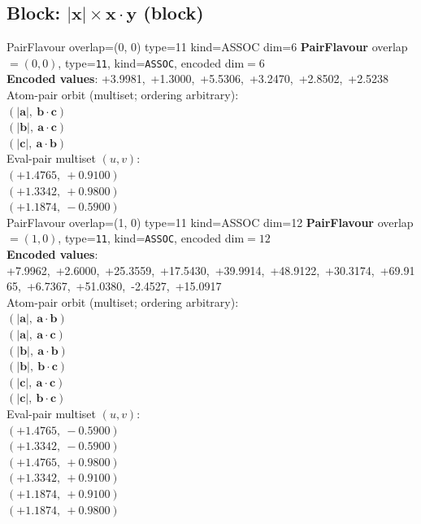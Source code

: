 \documentclass[a4paper,11pt]{article}
\newcommand{\vc}[1]{\ensuremath{\mathbf{#1}}}
\newcommand{\dnfagmiihhiejm}[1]{|\vc{#1}|}
\newcommand{\pdcegfomjfhook}[2]{\mathbf{#1} \cdot \mathbf{#2}}
\begin{document}
\subsection{Block: $\dnfagmiihhiejm{x} \times \pdcegfomjfhook{x}{y}$  (block)}
    PairFlavour  overlap=(0, 0)  type=11  kind=ASSOC  dim=6
\textbf{PairFlavour} overlap$=(0, 0)$, type=\texttt{11}, kind=\texttt{ASSOC}, encoded dim$=6$\\
\textbf{      Encoded values}: +3.9981,\ +1.3000,\ +5.5306,\ +3.2470,\ +2.8502,\ +2.5238\\
\quad Atom-pair orbit (multiset; ordering arbitrary):\\
$(\dnfagmiihhiejm{a},\ \pdcegfomjfhook{b}{c})$\\
$(\dnfagmiihhiejm{b},\ \pdcegfomjfhook{a}{c})$\\
$(\dnfagmiihhiejm{c},\ \pdcegfomjfhook{a}{b})$\\
\quad Eval-pair multiset $(u, v)$:\\
$(+1.4765,\ +0.9100)$\\
$(+1.3342,\ +0.9800)$\\
$(+1.1874,\ -0.5900)$\\
    PairFlavour  overlap=(1, 0)  type=11  kind=ASSOC  dim=12
\textbf{PairFlavour} overlap$=(1, 0)$, type=\texttt{11}, kind=\texttt{ASSOC}, encoded dim$=12$\\
\textbf{      Encoded values}: +7.9962,\ +2.6000,\ +25.3559,\ +17.5430,\ +39.9914,\ +48.9122,\ +30.3174,\ +69.9165,\ +6.7367,\ +51.0380,\ -2.4527,\ +15.0917\\
\quad Atom-pair orbit (multiset; ordering arbitrary):\\
$(\dnfagmiihhiejm{a},\ \pdcegfomjfhook{a}{b})$\\
$(\dnfagmiihhiejm{a},\ \pdcegfomjfhook{a}{c})$\\
$(\dnfagmiihhiejm{b},\ \pdcegfomjfhook{a}{b})$\\
$(\dnfagmiihhiejm{b},\ \pdcegfomjfhook{b}{c})$\\
$(\dnfagmiihhiejm{c},\ \pdcegfomjfhook{a}{c})$\\
$(\dnfagmiihhiejm{c},\ \pdcegfomjfhook{b}{c})$\\
\quad Eval-pair multiset $(u, v)$:\\
$(+1.4765,\ -0.5900)$\\
$(+1.3342,\ -0.5900)$\\
$(+1.4765,\ +0.9800)$\\
$(+1.3342,\ +0.9100)$\\
$(+1.1874,\ +0.9100)$\\
$(+1.1874,\ +0.9800)$\\
\end{document}
